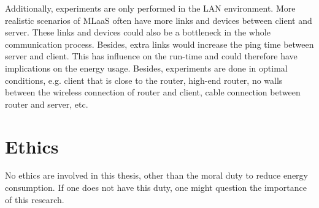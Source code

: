 \documentclass[../thesis.tex]{subfiles}
\begin{document}
Additionally, experiments are only performed in the LAN environment. More realistic scenarios of MLaaS often have more links and devices between client and server. These links and devices could also be a bottleneck in the whole communication process. Besides, extra links would increase the ping time between server and client. This has influence on the run-time and could therefore have implications on the energy usage. Besides, experiments are done in optimal conditions, e.g. client that is close to the router, high-end router, no walls between the wireless connection of router and client, cable connection between router and server, etc. 

\section{Ethics}
No ethics are involved in this thesis, other than the moral duty to reduce energy consumption. If one does not have this duty, one might question the importance of this research. 
\end{document}
